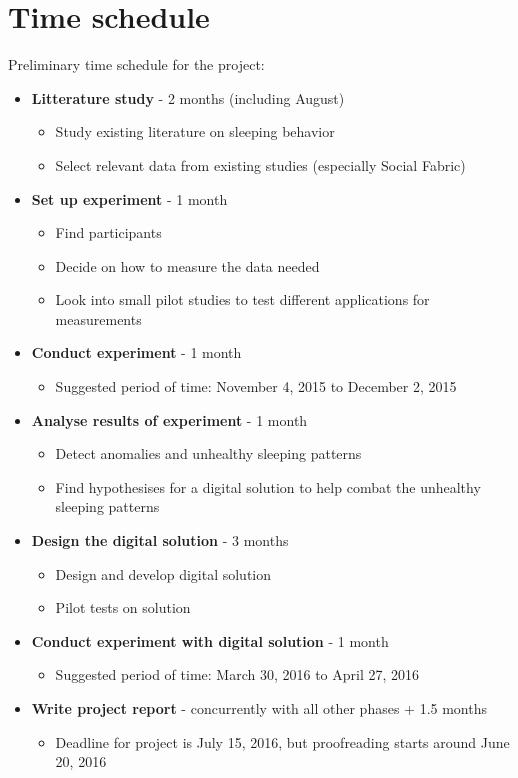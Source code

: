 \documentclass[12pt]{article}
\begin{document}
\section{Time schedule}
Preliminary time schedule for the project:
	\begin{itemize}
		\item \textbf{Litterature study} - 2 months (including August)
			\begin{itemize}
				\item Study existing literature on sleeping behavior
				\item Select relevant data from existing studies (especially Social Fabric)
			\end{itemize}	
		\item \textbf{Set up experiment} - 1 month
			\begin{itemize}
				\item Find participants
				\item Decide on how to measure the data needed
				\item Look into small pilot studies to test different applications for measurements
			\end{itemize}	
		\item \textbf{Conduct experiment} - 1 month
			\begin{itemize}
				\item Suggested period of time: November 4, 2015 to December 2, 2015
			\end{itemize}	
		\item \textbf{Analyse results of experiment} - 1 month
			\begin{itemize}
				\item Detect anomalies and unhealthy sleeping patterns
				\item Find hypothesises for a digital solution to help combat the unhealthy sleeping 
				patterns   
			\end{itemize}	
		\item \textbf{Design the digital solution} - 3 months 
			\begin{itemize}
				\item Design and develop digital solution
				\item Pilot tests on solution 
			\end{itemize}	
		\item \textbf{Conduct experiment with digital solution} - 1 month
			\begin{itemize}
				\item Suggested period of time: March 30, 2016 to April 27, 2016
			\end{itemize}	
		\item \textbf{Write project report} - concurrently with all other phases + 1.5 months
			\begin{itemize}
				\item Deadline for project is July 15, 2016, but proofreading starts around June 20, 2016 
			\end{itemize}	
	\end{itemize}

%




\end{document}
